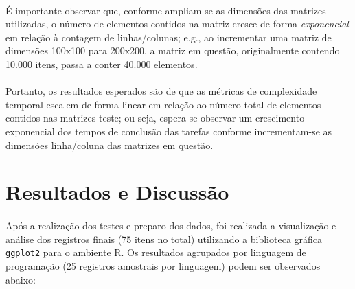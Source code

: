 \documentclass[11pt]{article}
\begin{document}
\paragraph{}
É importante observar que, conforme ampliam-se as dimensões das matrizes
utilizadas, o número de elementos contidos na matriz cresce de forma
\textit{exponencial} em relação à contagem de linhas/colunas; e.g., ao
incrementar uma matriz de dimensões 100x100 para 200x200, a matriz em questão,
originalmente contendo 10.000 itens, passa a conter 40.000 elementos.

\paragraph{}
Portanto, os resultados esperados são de que as métricas de complexidade
temporal escalem de forma linear em relação ao número total de elementos
contidos nas matrizes-teste; ou seja, espera-se observar um crescimento
exponencial dos tempos de conclusão das tarefas conforme incrementam-se as
dimensões linha/coluna das matrizes em questão\cite{stothers2010complexity}.

\newpage
\section{Resultados e Discussão}

\paragraph{}
Após a realização dos testes e preparo dos dados, foi realizada a visualização e
análise dos registros finais (75 itens no total) utilizando a biblioteca gráfica
\texttt{ggplot2} para o ambiente R. Os resultados agrupados por linguagem de
programação (25 registros amostrais por linguagem) podem ser observados abaixo:
\end{document}
